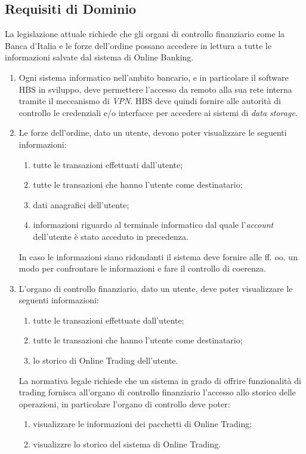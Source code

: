 \subsection{Requisiti di Dominio}
\label{sec:utente:dominio}

La legislazione attuale richiede che gli organi di controllo finanziario come la Banca d'Italia e le forze dell'ordine possano accedere in lettura a tutte le informazioni salvate dal sistema di Online Banking.

\begin{enumerate}
\item Ogni sistema informatico nell'ambito bancario, e in particolare il software HBS in sviluppo, deve permettere l'accesso da remoto alla sua rete interna tramite il meccanismo di \emph{VPN}.
	HBS deve quindi fornire alle autorit\`a di controllo le credenziali e/o interfacce per accedere ai sistemi di \emph{data storage}.

	\item Le forze dell'ordine, dato un utente, devono poter visualizzare le seguenti informazioni:
        	\begin{enumerate}
            	\item tutte le transazioni effettuati dall'utente;
            	\item tutte le transazioni che hanno l'utente come destinatario;
	            \item dati anagrafici dell'utente;
    	        \item informazioni riguardo al terminale informatico dal quale l'\emph{account} dell'utente \`e stato acceduto in precedenza.
	        \end{enumerate}
	    In caso le informazioni siano ridondanti il sistema deve fornire alle ff. oo. un modo per confrontare le informazioni e fare il controllo di coerenza.

	\item L'organo di controllo finanziario, dato un utente, deve poter visualizzare le seguenti informazioni:
        	\begin{enumerate}
	            \item tutte le transazioni effettuate dall'utente;
    	        \item tutte le transazioni che hanno l'utente come destinatario;
	            \item lo storico di Online Trading dell'utente.
    	    \end{enumerate}
	La normativa legale richiede che un sistema in grado di offrire funzionalit\`a di trading fornisca all'organo di controllo finanziario l'accesso allo storico delle operazioni, in particolare l'organo di controllo deve poter:
	\begin{enumerate}
    	\item visualizzare le informazioni dei pacchetti di Online Trading;
    	\item visualizzre lo storico del sistema di Online Trading.
	\end{enumerate}


\end{enumerate}
